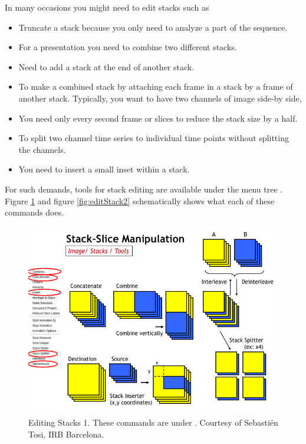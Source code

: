In many occasions you might need to edit stacks such as
\begin{itemize}
\item Truncate a stack because you only need to analyze a part of the sequence.
\item For a presentation you need to combine two different stacks.
\item Need to add a stack at the end of another stack.
\item To make a combined stack by attaching each frame in a stack by a frame of another stack. Typically, you want to have two channels of image side-by side,
\item You need only every second frame or slices to reduce the stack size by a half. 
\item To split two channel time series to individual time points without splitting the channels. 
\item You need to insert a small inset within a stack. 
\end{itemize}
For such demands, tools for stack editing are available under the menu tree . Figure \ref{fig:editStack1} and figure \ref{fig:editStack2} schematically shows what each of these commands does. 
\begin{figure}[hbtp]
\begin{center}
\includegraphics[width=\textwidth]{fig/stackEditing1.png}
\caption{Editing Stacks 1. These commands are under . Courtesy of Sebasti\'{e}n Tosi, IRB Barcelona.}
\label{fig:editStack1}
\end{center}
\end{figure}



